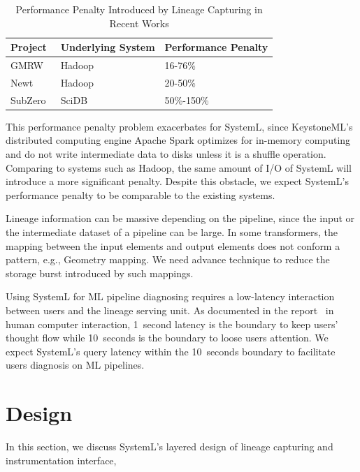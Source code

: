 \documentclass{sig-alternate}
\begin{document}
\begin{table}[ht]
\begin{center}
    \caption{Performance Penalty Introduced by Lineage Capturing in Recent Works}
    \begin{scriptsize}
    \begin{tabular}{ | p{2.25cm} | p{2.25cm} | p{2.25cm} |}
    \hline
    Project & Underlying System & Performance Penalty  \\ \hline \hline
    GMRW~\cite{ikeda11} & Hadoop~\cite{HADOOP} & 16-76\% \\ \hline
    Newt~\cite{logothetis13} & Hadoop~\cite{HADOOP} & 20-50\% \\ \hline
    SubZero~\cite{wu13} & SciDB~\cite{brown10} & 50\%-150\% \\ \hline
    \end{tabular}
    \end{scriptsize}
    \label{tb:overhead}
\end{center}   
\end{table}

This performance penalty problem exacerbates for SystemL, since KeystoneML's distributed computing engine Apache Spark 
optimizes for in-memory computing and do not write intermediate data to disks unless it is a shuffle operation. 
Comparing to systems such as Hadoop, the same amount of I/O of SystemL will introduce a more significant penalty.
Despite this obstacle, we expect SystemL's performance penalty to be comparable to the existing systems.

Lineage information can be massive depending on the pipeline, since the input or the intermediate dataset of a pipeline can be large.
In some transformers, the mapping between the input elements and output elements does not conform a pattern, e.g., Geometry mapping.
We need advance technique to reduce the storage burst introduced by such mappings.

Using SystemL for ML pipeline diagnosing requires a low-latency interaction between users and the lineage serving unit.
As documented in the report~\cite{nielsen2009} in human computer interaction, 1~second latency is the boundary to keep users' thought flow while 10~seconds
is the boundary to loose users attention.
We expect SystemL's query latency within the 10~seconds boundary to facilitate users diagnosis on ML pipelines.

\section{Design}
\label{sec:Design}
In this section, we discuss SystemL's layered design of lineage capturing and instrumentation interface, 
\end{document}

